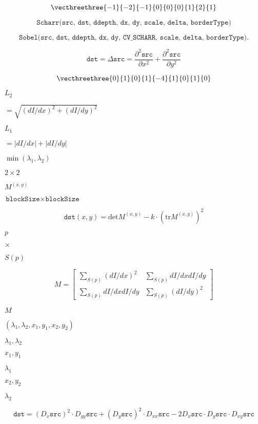 \documentclass{article}
\begin{document}
\[\vecthreethree{-1}{-2}{-1}{0}{0}{0}{1}{2}{1}\]
\pagebreak

\[\texttt{Scharr(src, dst, ddepth, dx, dy, scale, delta, borderType)}\]
\pagebreak

\[\texttt{Sobel(src, dst, ddepth, dx, dy, CV\_SCHARR, scale, delta, borderType)} .\]
\pagebreak

\[\texttt{dst} =  \Delta \texttt{src} =  \frac{\partial^2 \texttt{src}}{\partial x^2} +  \frac{\partial^2 \texttt{src}}{\partial y^2}\]
\pagebreak

\[\vecthreethree {0}{1}{0}{1}{-4}{1}{0}{1}{0}\]
\pagebreak

$L_2$
\pagebreak

$=\sqrt{(dI/dx)^2 + (dI/dy)^2}$
\pagebreak

$L_1$
\pagebreak

$=|dI/dx|+|dI/dy|$
\pagebreak

$\min(\lambda_1, \lambda_2)$
\pagebreak

$2\times2$
\pagebreak

$M^{(x,y)}$
\pagebreak

$\texttt{blockSize} \times \texttt{blockSize}$
\pagebreak

\[\texttt{dst} (x,y) =  \mathrm{det} M^{(x,y)} - k  \cdot \left ( \mathrm{tr} M^{(x,y)} \right )^2\]
\pagebreak

$p$
\pagebreak

$\times$
\pagebreak

$S(p)$
\pagebreak

\[M =  \begin{bmatrix} \sum _{S(p)}(dI/dx)^2 &  \sum _{S(p)}dI/dx dI/dy  \\ \sum _{S(p)}dI/dx dI/dy &  \sum _{S(p)}(dI/dy)^2 \end{bmatrix}\]
\pagebreak

$M$
\pagebreak

$(\lambda_1, \lambda_2, x_1, y_1, x_2, y_2)$
\pagebreak

$\lambda_1, \lambda_2$
\pagebreak

$x_1, y_1$
\pagebreak

$\lambda_1$
\pagebreak

$x_2, y_2$
\pagebreak

$\lambda_2$
\pagebreak

\[\texttt{dst} = (D_x  \texttt{src} )^2  \cdot D_{yy}  \texttt{src} + (D_y  \texttt{src} )^2  \cdot D_{xx}  \texttt{src} - 2 D_x  \texttt{src} \cdot D_y  \texttt{src} \cdot D_{xy}  \texttt{src}\]
\pagebreak
\end{document}
